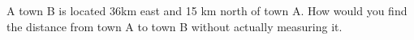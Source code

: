 A town B is located 36km east and 15 km north of town A. How would you find the distance from town A to town B without actually measuring it.
